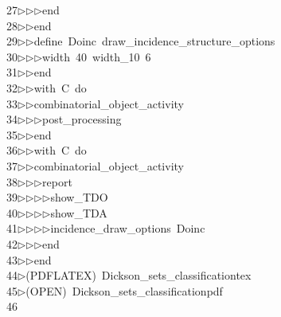 \begin{tabbing}
27\>$\triangleright$\>$\triangleright$\>$\triangleright$\>end\ \\[0pt]
28\>$\triangleright$\>$\triangleright$\>end\ \\[0pt]
29\>$\triangleright$\>$\triangleright$\>define\ Doinc\ draw\_incidence\_structure\_options\ \\[0pt]
30\>$\triangleright$\>$\triangleright$\>$\triangleright$\>width\ 40\ width\_10\ 6\ \\[0pt]
31\>$\triangleright$\>$\triangleright$\>end\ \\[0pt]
32\>$\triangleright$\>$\triangleright$\>with\ C\ do\ \\[0pt]
33\>$\triangleright$\>$\triangleright$\>combinatorial\_object\_activity\ \\[0pt]
34\>$\triangleright$\>$\triangleright$\>$\triangleright$\>post\_processing\ \\[0pt]
35\>$\triangleright$\>$\triangleright$\>end\ \\[0pt]
36\>$\triangleright$\>$\triangleright$\>with\ C\ do\ \\[0pt]
37\>$\triangleright$\>$\triangleright$\>combinatorial\_object\_activity\ \\[0pt]
38\>$\triangleright$\>$\triangleright$\>$\triangleright$\>report\ \\[0pt]
39\>$\triangleright$\>$\triangleright$\>$\triangleright$\>$\triangleright$\>show\_TDO\ \\[0pt]
40\>$\triangleright$\>$\triangleright$\>$\triangleright$\>$\triangleright$\>show\_TDA\ \\[0pt]
41\>$\triangleright$\>$\triangleright$\>$\triangleright$\>$\triangleright$\>incidence\_draw\_options\ Doinc\ \\[0pt]
42\>$\triangleright$\>$\triangleright$\>$\triangleright$\>end\ \\[0pt]
43\>$\triangleright$\>$\triangleright$\>end\\[0pt]
44\>$\triangleright$\>(PDFLATEX)\ Dickson\_sets\_classificationtex\\[0pt]
45\>$\triangleright$\>(OPEN)\ Dickson\_sets\_classificationpdf\\[0pt]
46\>\end{tabbing}
